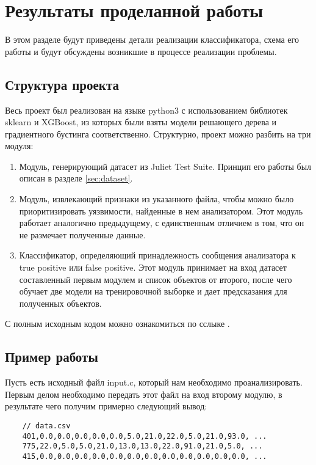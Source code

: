 \section{Результаты проделанной работы}
\label{sec:Chapter4} 

В этом разделе будут приведены детали реализации классификатора, схема его работы и будут обсуждены возникшие в процессе реализации проблемы.

\subsection{Структура проекта}

Весь проект был реализован на языке python3 с использованием библиотек sklearn и XGBoost, из которых были взяты модели решающего дерева и градиентного бустинга соответственно. Структурно, проект можно разбить на три модуля:

\begin{enumerate}
    \item Модуль, генерирующий датасет из Juliet Test Suite. Принцип его работы был описан в разделе \ref{sec:dataset}.
    \item Модуль, извлекающий признаки из указанного файла, чтобы можно было приоритизировать уязвимости, найденные в нем анализатором. Этот модуль работает аналогично предыдущему, с единственным отличием в том, что он не размечает полученные данные.
    \item Классификатор, определяющий принадлежность сообщения анализатора к true positive или false positive. Этот модуль принимает на вход датасет составленный первым модулем и список объектов от второго, после чего обучает две модели на тренировочной выборке и дает предсказания для полученных объектов.
\end{enumerate}

С полным исходным кодом можно ознакомиться по сслыке \cite{source-code}.

\subsection{Пример работы}

Пусть есть исходный файл input.c, который нам необходимо проанализировать. Первым делом необходимо передать этот файл на вход второму модулю, в результате чего получим примерно следующий вывод:

\begin{verbatim}
    // data.csv
    401,0.0,0.0,0.0,0.0,0.0,5.0,21.0,22.0,5.0,21.0,93.0, ...
    775,22.0,5.0,5.0,21.0,13.0,13.0,22.0,91.0,21.0,5.0, ... 
    415,0.0,0.0,0.0,0.0,0.0,0.0,0.0,0.0,0.0,0.0,0.0,0.0, ...
\end{verbatim}

